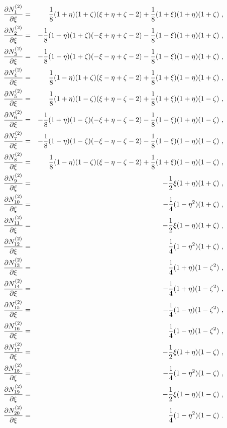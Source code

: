 \begin{eqnarray}
\label{bfquadhexdx1}
\ppd{N_{1}^{(2)}}{\xi} &=& \del{1}{8} (1 + \eta) (1 + \zeta)
(\xi + \eta + \zeta - 2) + \del{1}{8} (1 + \xi) (1 + \eta) (1 + \zeta)\ ,
\\ \label{bfquadhexdx2}
\ppd{N_{2}^{(2)}}{\xi} &=& - \del{1}{8} (1 + \eta) (1 + \zeta)
(- \xi + \eta + \zeta - 2) - \del{1}{8} (1 - \xi) (1 + \eta) (1 + \zeta)\ ,
\\ \label{bfquadhexdx3}
\ppd{N_{3}^{(2)}}{\xi} &=& - \del{1}{8} (1 - \eta) (1 + \zeta)
(- \xi - \eta + \zeta - 2) - \del{1}{8} (1 - \xi) (1 - \eta) (1 + \zeta)\ ,
\\ \label{bfquadhexdx4}
\ppd{N_{4}^{(2)}}{\xi} &=& \del{1}{8} (1 - \eta) (1 + \zeta)
(\xi - \eta + \zeta - 2) + \del{1}{8} (1 + \xi) (1 - \eta) (1 + \zeta)\ ,
\\ \label{bfquadhexdx5}
\ppd{N_{5}^{(2)}}{\xi} &=& \del{1}{8} (1 + \eta) (1 - \zeta)
(\xi + \eta - \zeta - 2) + \del{1}{8} (1 + \xi) (1 + \eta) (1 - \zeta)\ ,
\\ \label{bfquadhexdx6}
\ppd{N_{6}^{(2)}}{\xi} &=& - \del{1}{8} (1 + \eta) (1 - \zeta)
(- \xi + \eta - \zeta - 2) - \del{1}{8} (1 - \xi) (1 + \eta) (1 - \zeta)\ ,
\\ \label{bfquadhexdx7}
\ppd{N_{7}^{(2)}}{\xi} &=& - \del{1}{8} (1 - \eta) (1 - \zeta)
(- \xi - \eta - \zeta - 2) - \del{1}{8} (1 - \xi) (1 - \eta) (1 - \zeta)\ ,
\\ \label{bfquadhexdx8}
\ppd{N_{8}^{(2)}}{\xi} &=& \del{1}{8} (1 - \eta) (1 - \zeta)
(\xi - \eta - \zeta - 2) + \del{1}{8} (1 + \xi) (1 - \eta) (1 - \zeta)\ ,
\\ \label{bfquadhexdx9}
\ppd{N_{9}^{(2)}}{\xi} &=& - \del{1}{2} \xi (1 + \eta) (1 + \zeta)\ ,
\\ \label{bfquadhexdx10}
\ppd{N_{10}^{(2)}}{\xi} &=& - \del{1}{4} (1 - \eta^2) (1 + \zeta)\ ,
\\ \label{bfquadhexdx11}
\ppd{N_{11}^{(2)}}{\xi} &=& - \del{1}{2} \xi (1 - \eta) (1 + \zeta)\ ,
\\ \label{bfquadhexdx12}
\ppd{N_{12}^{(2)}}{\xi} &=& \del{1}{4} (1 - \eta^2) (1 + \zeta)\ ,
\\ \label{bfquadhexdx13}
\ppd{N_{13}^{(2)}}{\xi} &=& \del{1}{4} (1 + \eta) (1 - \zeta^2)\ ,
\\ \label{bfquadhexdx14}
\ppd{N_{14}^{(2)}}{\xi} &=& - \del{1}{4} (1 + \eta) (1 - \zeta^2)\ ,
\\ \label{bfquadhexdx15}
\ppd{N_{15}^{(2)}}{\xi} &=& - \del{1}{4} (1 - \eta) (1 - \zeta^2)\ ,
\\ \label{bfquadhexdx16}
\ppd{N_{16}^{(2)}}{\xi} &=& \del{1}{4} (1 - \eta) (1 - \zeta^2)\ ,
\\ \label{bfquadhexdx17}
\ppd{N_{17}^{(2)}}{\xi} &=& - \del{1}{2} \xi (1 + \eta) (1 - \zeta)\ ,
\\ \label{bfquadhexdx18}
\ppd{N_{18}^{(2)}}{\xi} &=& - \del{1}{4} (1 - \eta^2) (1 - \zeta)\ ,
\\ \label{bfquadhexdx19}
\ppd{N_{19}^{(2)}}{\xi} &=& - \del{1}{2} \xi (1 - \eta) (1 - \zeta)\ ,
\\ \label{bfquadhexdx20}
\ppd{N_{20}^{(2)}}{\xi} &=& \del{1}{4} (1 - \eta^2) (1 - \zeta)\ .
\end{eqnarray}

